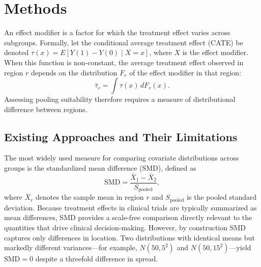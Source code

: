 \documentclass[AMA,Times1COL]{WileyNJDv5}
\begin{document}
\section{Methods}\label{sec:methods}

An effect modifier is a factor for which the treatment effect varies across subgroups. Formally, let the conditional average treatment effect (CATE) be denoted $\tau(x) = E[Y(1) - Y(0) \mid X = x]$, where $X$ is the effect modifier. When this function is non-constant, the average treatment effect observed in region $r$ depends on the distribution $F_r$ of the effect modifier in that region:
\begin{equation}
\bar{\tau}_r = \int \tau(x) \, dF_r(x).
\label{eq:regional_ate}
\end{equation}
Assessing pooling suitability therefore requires a measure of distributional difference between regions.

\subsection{Existing Approaches and Their Limitations}\label{sec:existing}

The most widely used measure for comparing covariate distributions across groups is the standardized mean difference (SMD), defined as
\begin{equation}
\text{SMD} = \frac{\bar{X}_1 - \bar{X}_2}{S_{\text{pooled}}},
\label{eq:smd}
\end{equation}
where $\bar{X}_r$ denotes the sample mean in region $r$ and $S_{\text{pooled}}$ is the pooled standard deviation.\cite{austin2011} Because treatment effects in clinical trials are typically summarized as mean differences, SMD provides a scale-free comparison directly relevant to the quantities that drive clinical decision-making. However, by construction SMD captures only differences in location. Two distributions with identical means but markedly different variances---for example, $N(50, 5^2)$ and $N(50, 15^2)$---yield $\text{SMD} = 0$ despite a threefold difference in spread.
\end{document}
